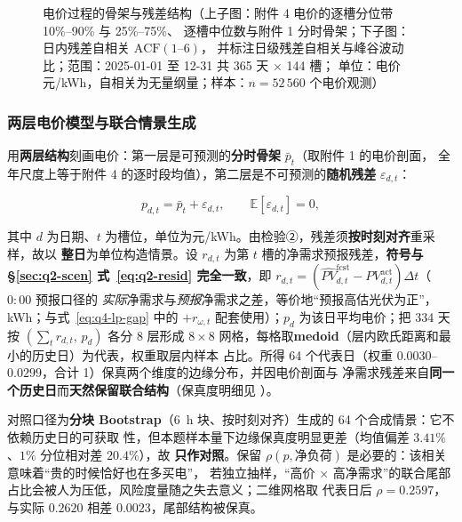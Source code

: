 \begin{figure}[htbp]
  \centering
  \caption{电价过程的骨架与残差结构（上子图：附件 4 电价的逐槽分位带 10\%--90\% 与 25\%--75\%、
           逐槽中位数与附件 1 分时骨架；下子图：日内残差自相关 \(\mathrm{ACF}(1\text{--}6)\)，
           并标注日级残差自相关与峰谷波动比；范围：2025-01-01 至 12-31 共 365 天 \(\times\) 144 槽；
           单位：电价 元/kWh，自相关为无量纲量；样本：\(n=52\,560\) 个电价观测）}
  \label{fig:q4-price}
\end{figure}

\subsubsection{两层电价模型与联合情景生成}\label{sec:q4-price}

用\textbf{两层结构}刻画电价：第一层是可预测的\textbf{分时骨架} \(\bar p_t\)（取附件 1 的电价剖面，
全年尺度上等于附件 4 的逐时段均值），第二层是不可预测的\textbf{随机残差} \(\varepsilon_{d,t}\)：

\begin{equation}
  p_{d,t}=\bar p_t+\varepsilon_{d,t},\qquad \mathbb{E}[\varepsilon_{d,t}]=0 ,
  \label{eq:q4-price}
\end{equation}

其中 \(d\) 为日期、\(t\) 为槽位，单位为元/kWh。由检验②，残差须\textbf{按时刻对齐}重采样，故以
\textbf{整日}为单位构造情景。设 \(r_{d,t}\) 为第 \(t\) 槽的净需求预报残差，\textbf{符号与
\S\ref{sec:q2-scen} 式~\eqref{eq:q2-resid} 完全一致}，即
\(r_{d,t}=(\widehat{PV}^{\text{fcst}}_{d,t}-PV^{\text{act}}_{d,t})\Delta t\)（\(0{:}00\) 预报口径的
\emph{实际}净需求与\emph{预报}净需求之差，等价地“预报高估光伏为正”，kWh；与式~\eqref{eq:q4-lp-gap}
中的 \(+r_{\omega,t}\) 配套使用）；\(p_d\) 为该日平均电价；把 334 天按 \((\sum_tr_{d,t},\,p_d)\) 各分
8 层形成 \(8\times8\) 网格，每格取\textbf{medoid}（层内欧氏距离和最小的历史日）为代表，权重取层内样本
占比。所得 64 个代表日（权重 \(0.0030\)--\(0.0299\)，合计 1）保真两个维度的边缘分布，并因电价剖面与
净需求残差来自\textbf{同一个历史日}而\textbf{天然保留联合结构}（保真度明细见 ）。



对照口径为\textbf{分块 Bootstrap}（6~h 块、按时刻对齐）生成的 64 个合成情景：它不依赖历史日的可获取
性，但本题样本量下边缘保真度明显更差（均值偏差 \(3.41\%\)、\(1\%\) 分位相对差 \(20.4\%\)），故
\textbf{只作对照}。保留 \(\rho(p,\text{净负荷})\) 是必要的：该相关意味着“贵的时候恰好也在多买电”，
若独立抽样，“高价 \(\times\) 高净需求”的联合尾部占比会被人为压低，风险度量随之失去意义；二维网格取
代表日后 \(\rho=0.2597\)，与实际 \(0.2620\) 相差 \(0.0023\)，尾部结构被保真。

